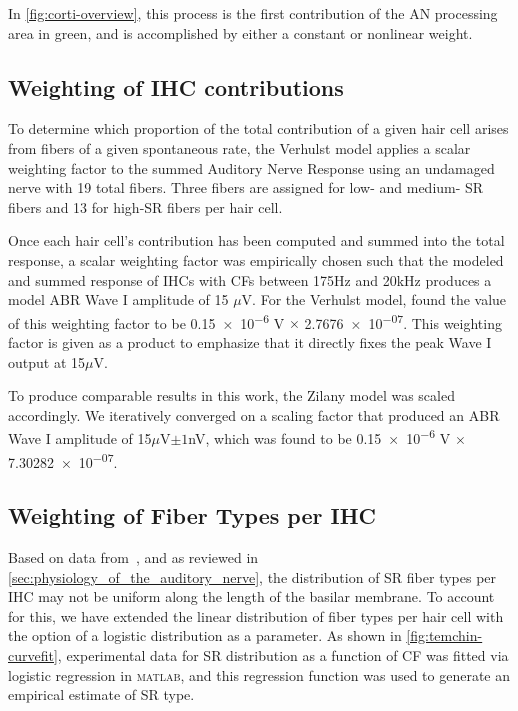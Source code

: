 In \autoref{fig:corti-overview}, this process is the first contribution of the AN processing area in green, and is accomplished by either a constant or nonlinear weight.

\subsection{Weighting of IHC contributions} %
\label{sub:weighting_of_ihc_contribution}
To determine which proportion of the total contribution of a given hair cell arises from fibers of a given spontaneous rate, the Verhulst model applies a scalar weighting factor to the summed Auditory Nerve Response using an undamaged nerve with 19 total fibers. Three fibers are assigned for low- and medium- SR fibers and 13 for high-SR fibers per hair cell. 

Once each hair cell's contribution has been computed and summed into the total response,  a scalar weighting factor was empirically chosen such that the modeled and summed response of IHCs with CFs between 175Hz and 20kHz produces a model ABR Wave I amplitude of 15 $\mu$V.  For the Verhulst model, \cite{Verhulst2015Functional} found the value of this weighting factor to be \num{0.15e-6} V $\times$ \num{2.7676e-07}.  This weighting factor is given as a product to emphasize that it directly fixes the peak Wave I output at 15$\mu$V. 

To produce comparable results in this work, the Zilany model was scaled accordingly. We iteratively converged on a scaling factor that produced an ABR Wave I amplitude of 15$\mu$V$\pm 1$nV, which was found to be \num{0.15e-6} V $\times$ \num{7.30282e-07}.

\subsection{Weighting of Fiber Types per IHC} %
\label{sub:weighting_of_fiber_types_per_ihc}
Based on data from~\cite{Temchin2008Threshold}, and as reviewed in \autoref{sec:physiology_of_the_auditory_nerve}, the distribution of SR fiber types per IHC may not be uniform along the length of the basilar membrane.  To account for this, we have extended the linear distribution of fiber types per hair cell with the option of a logistic distribution as a parameter.   As shown in \autoref{fig:temchin-curvefit}, experimental data for SR distribution as a function of CF was fitted via logistic regression in \textsc{matlab}, and this regression function was used to generate an empirical estimate of SR type. 

